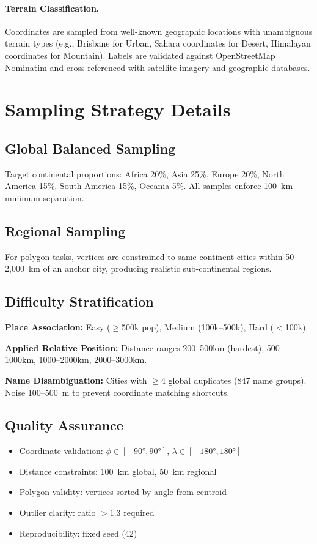 \paragraph{Terrain Classification.}
Coordinates are sampled from well-known geographic locations with unambiguous terrain types (e.g., Brisbane for Urban, Sahara coordinates for Desert, Himalayan coordinates for Mountain). Labels are validated against OpenStreetMap Nominatim and cross-referenced with satellite imagery and geographic databases.

\section{Sampling Strategy Details}
\label{app:sampling_details}

\subsection{Global Balanced Sampling}
Target continental proportions: Africa 20\%, Asia 25\%, Europe 20\%, North America 15\%, South America 15\%, Oceania 5\%. All samples enforce 100~km minimum separation.

\subsection{Regional Sampling}
For polygon tasks, vertices are constrained to same-continent cities within 50--2,000~km of an anchor city, producing realistic sub-continental regions.

\subsection{Difficulty Stratification}
\textbf{Place Association:} Easy ($\geq$500k pop), Medium (100k--500k), Hard ($<$100k).

\textbf{Applied Relative Position:} Distance ranges 200--500km (hardest), 500--1000km, 1000--2000km, 2000--3000km.

\textbf{Name Disambiguation:} Cities with $\geq$4 global duplicates (847 name groups). Noise 100--500~m to prevent coordinate matching shortcuts.

\subsection{Quality Assurance}
\label{app:quality_assurance}
\begin{itemize}[leftmargin=*, itemsep=1pt]
    \item Coordinate validation: $\phi \in [-90°, 90°]$, $\lambda \in [-180°, 180°]$
    \item Distance constraints: 100~km global, 50~km regional
    \item Polygon validity: vertices sorted by angle from centroid
    \item Outlier clarity: ratio $>1.3$ required
    \item Reproducibility: fixed seed (42)
\end{itemize}

